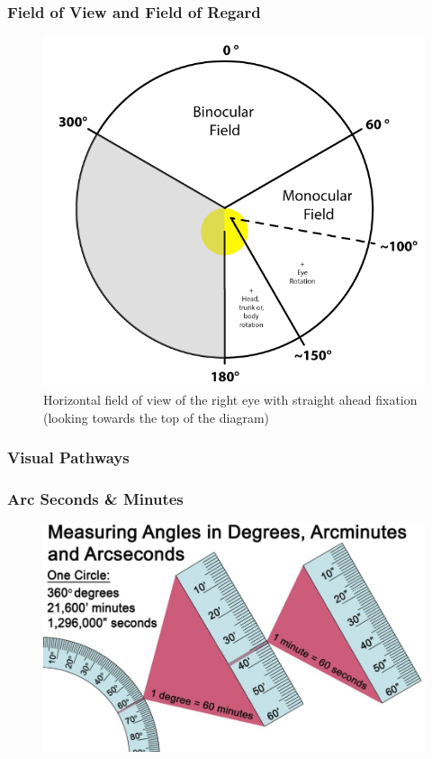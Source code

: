 \begin{frame}
	\frametitle{Field of View and Field of Regard}
	\begin{figure}
		\includegraphics[scale=.3]{assets/fov} 
		\caption{Horizontal field of view of the right eye with straight ahead fixation (looking towards the top of the diagram)}
	\end{figure}
\end{frame}

\begin{frame}
	\frametitle{Visual Pathways}

\end{frame}

\begin{frame}
	\frametitle{Arc Seconds \& Minutes}
	\pause
	\begin{figure}
		\includegraphics[scale=.4]{assets/arc} 
	\end{figure}
\end{frame}

